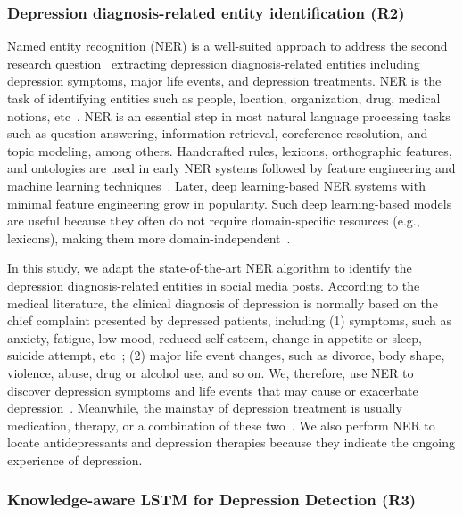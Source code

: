 \subsubsection{Depression diagnosis-related entity identification (R2)}\label{sec:related:four:r2}

Named entity recognition (NER) is a well-suited approach to address the second research question \textendash~extracting depression diagnosis-related entities including depression symptoms, major life events, and depression treatments. NER is the task of identifying entities such as people, location, organization, drug, medical notions, etc~\citep{nadeau_survey_2007}.  NER is an essential step in most natural language processing tasks such as question answering, information retrieval, coreference resolution, and topic modeling, among others. Handcrafted rules, lexicons, orthographic features, and ontologies are used in early NER systems followed by feature engineering and machine learning techniques~\citep{nadeau_survey_2007}. Later, deep learning-based NER systems with minimal feature engineering grow in popularity. Such deep learning-based models are useful because they often do not require domain-specific resources (e.g., lexicons), making them more domain-independent~\citep{yadav_survey_2019}.

In this study, we adapt the state-of-the-art NER algorithm to identify the depression diagnosis-related entities in social media posts. According to the medical literature, the clinical diagnosis of depression is normally based on the chief complaint presented by depressed patients, including (1) symptoms, such as anxiety, fatigue, low mood, reduced self-esteem, change in appetite or sleep, suicide attempt, etc~\citep{apa_diagnostic_2013}; (2) major life event changes, such as divorce, body shape, violence, abuse, drug or alcohol use, and so on. We, therefore, use NER to discover depression symptoms and life events that may cause or exacerbate depression~\citep{beck_depression_2014}. Meanwhile, the mainstay of depression treatment is usually medication, therapy, or a combination of these two~\citep{mitchell_understanding_2008}. We also perform NER to locate antidepressants and depression therapies because they indicate the ongoing experience of depression. 

\subsubsection{Knowledge-aware LSTM for Depression Detection (R3)}\label{sec:related:four:r3}

